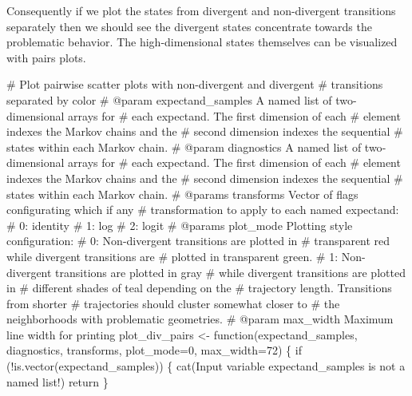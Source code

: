 \documentclass[
  letterpaper,
  DIV=11,
  numbers=noendperiod]{scrartcl}
\newenvironment{Shaded}{\begin{snugshade}}{\end{snugshade}}
\newcommand{\AttributeTok}[1]{\textcolor[rgb]{0.40,0.45,0.13}{#1}}
\newcommand{\CommentTok}[1]{\textcolor[rgb]{0.37,0.37,0.37}{#1}}
\newcommand{\ControlFlowTok}[1]{\textcolor[rgb]{0.00,0.23,0.31}{#1}}
\newcommand{\DecValTok}[1]{\textcolor[rgb]{0.68,0.00,0.00}{#1}}
\newcommand{\FunctionTok}[1]{\textcolor[rgb]{0.28,0.35,0.67}{#1}}
\newcommand{\NormalTok}[1]{\textcolor[rgb]{0.00,0.23,0.31}{#1}}
\newcommand{\OtherTok}[1]{\textcolor[rgb]{0.00,0.23,0.31}{#1}}
\newcommand{\SpecialCharTok}[1]{\textcolor[rgb]{0.37,0.37,0.37}{#1}}
\newcommand{\StringTok}[1]{\textcolor[rgb]{0.13,0.47,0.30}{#1}}
\begin{document}
Consequently if we plot the states from divergent and non-divergent
transitions separately then we should see the divergent states
concentrate towards the problematic behavior. The high-dimensional
states themselves can be visualized with pairs plots.

\begin{Shaded}
\begin{Highlighting}[]
\CommentTok{\# Plot pairwise scatter plots with non{-}divergent and divergent }
\CommentTok{\# transitions separated by color}
\CommentTok{\# @param expectand\_samples A named list of two{-}dimensional arrays for }
\CommentTok{\#                          each expectand.  The first dimension of each}
\CommentTok{\#                          element indexes the Markov chains and the }
\CommentTok{\#                          second dimension indexes the sequential }
\CommentTok{\#                          states within each Markov chain.}
\CommentTok{\# @param diagnostics A named list of two{-}dimensional arrays for }
\CommentTok{\#                    each expectand.  The first dimension of each}
\CommentTok{\#                    element indexes the Markov chains and the }
\CommentTok{\#                    second dimension indexes the sequential }
\CommentTok{\#                    states within each Markov chain.}
\CommentTok{\# @params transforms Vector of flags configurating which if any}
\CommentTok{\#                    transformation to apply to each named expectand:}
\CommentTok{\#                      0: identity}
\CommentTok{\#                      1: log}
\CommentTok{\#                      2: logit}
\CommentTok{\# @params plot\_mode Plotting style configuration: }
\CommentTok{\#                     0: Non{-}divergent transitions are plotted in }
\CommentTok{\#                        transparent red while divergent transitions are}
\CommentTok{\#                        plotted in transparent green.}
\CommentTok{\#                     1: Non{-}divergent transitions are plotted in gray }
\CommentTok{\#                        while divergent transitions are plotted in }
\CommentTok{\#                        different shades of teal depending on the }
\CommentTok{\#                        trajectory length.  Transitions from shorter}
\CommentTok{\#                        trajectories should cluster somewhat closer to }
\CommentTok{\#                        the neighborhoods with problematic geometries.}
\CommentTok{\# @param max\_width Maximum line width for printing}
\NormalTok{plot\_div\_pairs }\OtherTok{\textless{}{-}} \ControlFlowTok{function}\NormalTok{(expectand\_samples, diagnostics, }
\NormalTok{                           transforms, }\AttributeTok{plot\_mode=}\DecValTok{0}\NormalTok{, }\AttributeTok{max\_width=}\DecValTok{72}\NormalTok{) \{}
  \ControlFlowTok{if}\NormalTok{ (}\SpecialCharTok{!}\FunctionTok{is.vector}\NormalTok{(expectand\_samples)) \{}
    \FunctionTok{cat}\NormalTok{(}\StringTok{\textquotesingle{}Input variable \textasciigrave{}expectand\_samples\textasciigrave{} is not a named list!\textquotesingle{}}\NormalTok{)}
\NormalTok{    return}
\NormalTok{  \}}
  

\end{Highlighting}
\end{Shaded}
\end{document}
